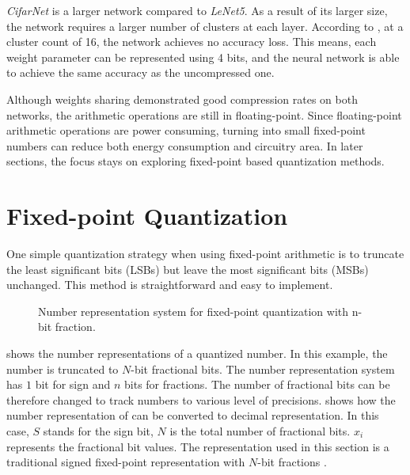 \documentclass[a4paper,12pt]{report}
\begin{document}
\textit{CifarNet} is a larger network compared to \textit{LeNet5}.
As a result of its larger size, the network requires a larger number of clusters
at each layer.
According to , at a cluster count of 16,
the network achieves no accuracy loss.
This means, each weight parameter can be represented using 4 bits, and
the neural network is able to achieve the same accuracy as the uncompressed
one.

Although weights sharing demonstrated good compression rates on both networks,
the arithmetic operations are still in floating-point.
Since floating-point arithmetic operations are power consuming, turning
into small fixed-point numbers can reduce both energy consumption and circuitry
area.
In later sections, the focus stays on exploring fixed-point based quantization
methods.

\section{Fixed-point Quantization}
One simple quantization strategy when using fixed-point arithmetic is to truncate
the least significant bits (LSBs) but leave the most significant bits (MSBs)
unchanged.
This method is straightforward and easy to implement.
\begin{figure}[!h]
\centering
{}
\caption{Number representation system for fixed-point quantization with n-bit fraction.}
\label{fig:number_rep_4bit}
\end{figure}

 shows the number representations of a quantized number.
In this example, the number is truncated to $N$-bit fractional bits.
The number representation system has $1$ bit for sign and
$n$ bits for fractions.
The number of fractional bits can be therefore changed to track numbers to various
level of precisions.
 shows how the number representation of 
can be converted to decimal representation.
In this case, $S$ stands for the sign bit, $N$ is the total number
of fractional bits.
$x_i$ represents the fractional bit values.
The representation used in this section is a traditional signed fixed-point
representation with $N$-bit fractions \cite{ercegovac2004digital}.
\end{document}
